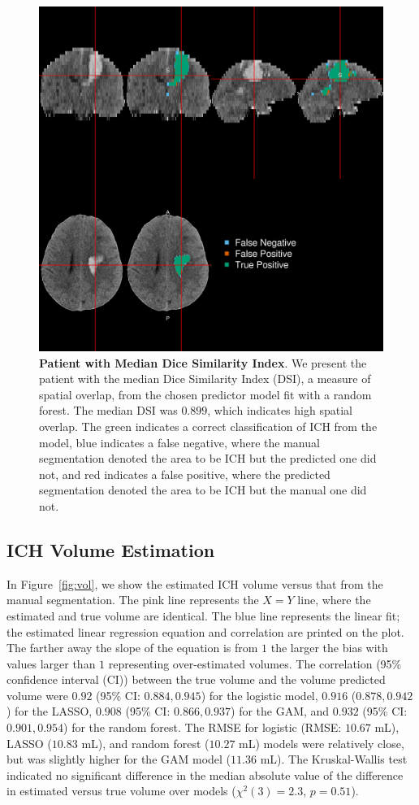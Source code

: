 \documentclass{elsarticle_nonatbib}\usepackage[]{graphicx}\usepackage[]{color}
\begin{document}
\begin{figure}
\centering
\includegraphics[width=0.75\linewidth,keepaspectratio]{Reseg_Figure_DSI_Quantile_050_native.png}
\caption{{\bf Patient with Median Dice Similarity Index}. We present the patient with the median Dice Similarity Index (DSI), a measure of spatial overlap, from the chosen predictor model fit with a random forest.  The median DSI was $0.899$, which indicates high spatial overlap. The green indicates a correct classification of ICH from the model, blue indicates a false negative, where the manual segmentation denoted the area to be ICH but the predicted one did not, and red indicates a false positive, where the predicted segmentation denoted the area to be ICH but the manual one did not. }
\label{fig:dice_img}
\end{figure}

\subsection{ICH Volume Estimation}
In Figure~\ref{fig:vol}, we show the estimated ICH volume versus that from the manual segmentation.  The pink line represents the $X = Y$ line, where the estimated and true volume are identical.  The blue line represents the linear fit; the estimated linear regression equation and correlation are printed on the plot.  The farther away the slope of the equation is from $1$ the larger the bias with values larger than $1$ representing over-estimated volumes.  
The correlation (95\% confidence interval (CI)) between the true volume and the volume predicted volume were $0.92$ (95\% CI: $0.884, 0.945$) for the logistic model, 
$0.916$ ($0.878, 0.942$) for the LASSO, 
$0.908$ (95\% CI: $0.866, 0.937$) for the GAM, and  
$0.932$ (95\% CI: $0.901, 0.954$) for the random forest.  The RMSE for logistic (RMSE: $10.67$ mL), LASSO ($10.83$ mL), and random forest ($10.27$ mL) models were relatively close, but was slightly higher for the GAM model ($11.36$ mL).  The  Kruskal-Wallis test indicated no significant difference in the median absolute value of the difference in estimated versus true volume over models ($\chi^{2}(3)=2.3$, $p = 0.51$).  
\end{document}
